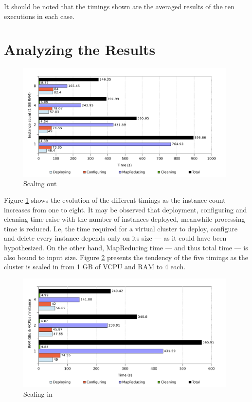 It should be noted that the timings shown are the averaged results of the ten executions in each case.

\section{Analyzing the Results}\label{sec:analisisresultados}

\begin{figure}[tbp]
\begin{center}
\includegraphics[width=0.98\textwidth]{imagenes/039.pdf}
\caption{Scaling out}
\label{fig:eschorizontal}
\end{center}
\end{figure}

\noindent Figure \ref{fig:eschorizontal} shows the evolution of the different timings as the instance count increases from one to eight. It may be observed that deployment, configuring and cleaning time raise with the number of instances deployed, meanwhile processing time is reduced. I.e, the time required for a virtual cluster to deploy, configure and delete every instance depends only on its size --- as it could have been hypothesized. On the other hand, MapReducing time --- and thus total time --- is also bound to input size. Figure \ref{fig:escvertical} presents the tendency of the five timings as the cluster is scaled in from 1 GB of VCPU and RAM to 4 each.

\begin{figure}[tbp]
\begin{center}
\includegraphics[width=0.98\textwidth]{imagenes/041.pdf}
\caption{Scaling in}
\label{fig:escvertical}
\end{center}
\end{figure}

